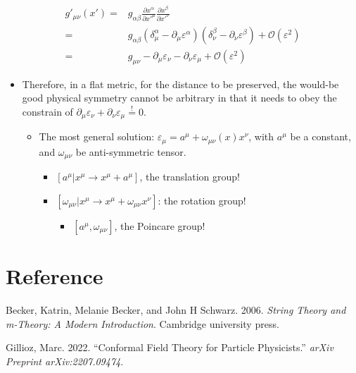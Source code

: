 \documentclass[
]{book}
\providecommand{\tightlist}{%
  \setlength{\itemsep}{0pt}\setlength{\parskip}{0pt}}
\newlength{\cslhangindent}
\newlength{\cslentryspacingunit} %
\newenvironment{CSLReferences}[2] %
 {%
  \setlength{\parindent}{0pt}
  \ifodd #1
  \let\oldpar\par
  \def\par{\hangindent=\cslhangindent\oldpar}
  \fi
  \setlength{\parskip}{#2\cslentryspacingunit}
 }%
 {}
\begin{document}
\begin{align}
  g'_{\mu\nu}(x')  =&  
  g_{\alpha\beta}
  \frac{\partial x^\alpha}{\partial x'^\mu}
  \frac{\partial x^\beta}{\partial x'^\nu} \\
  =& g_{\alpha\beta} 
  (\delta^\alpha_\mu - \partial_\mu \varepsilon^\alpha)
  (\delta^\beta_\nu - \partial_\nu \varepsilon^\beta) 
  + \mathcal{O}(\varepsilon^2) \\
  =&  g_{\mu\nu} - \partial_\mu \varepsilon_\nu - \partial_\nu \varepsilon_\mu 
  + \mathcal{O}(\varepsilon^2) 
\end{align}

\begin{itemize}
\tightlist
\item
  Therefore, in a flat metric, for the distance to be preserved, the would-be good physical symmetry cannot be arbitrary in that it needs to obey the constrain of \(\partial_\mu \varepsilon_\nu + \partial_\nu \varepsilon_\mu \overset{!}{=} 0\).

  \begin{itemize}
  \tightlist
  \item
    The most general solution: \(\varepsilon_\mu = a^\mu + \omega_{\mu\nu}(x) x^\nu\), with \(a^\mu\) be a constant, and \(\omega_{\mu\nu}\) be anti-symmetric tensor.

    \begin{itemize}
    \tightlist
    \item
      \([a^\mu|x^\mu\rightarrow{x^\mu+a^\mu}]\), the translation group!
    \item
      \([\omega_{\mu\nu}|x^\mu\rightarrow{x^\mu+\omega_{\mu\nu}x^\nu}]\): the rotation group!

      \begin{itemize}
      \tightlist
      \item
        \([a^\mu,\omega_{\mu\nu}]\), the Poincare group!
      \end{itemize}
    \end{itemize}
  \end{itemize}
\end{itemize}

\hypertarget{reference}{%
\section{Reference}\label{reference}}

\hypertarget{refs}{}
\begin{CSLReferences}{1}{0}
\leavevmode{}%
Becker, Katrin, Melanie Becker, and John H Schwarz. 2006. \emph{String Theory and m-Theory: A Modern Introduction}. Cambridge university press.

\leavevmode{}%
Gillioz, Marc. 2022. {``Conformal Field Theory for Particle Physicists.''} \emph{arXiv Preprint arXiv:2207.09474}.

\end{CSLReferences}
\end{document}
